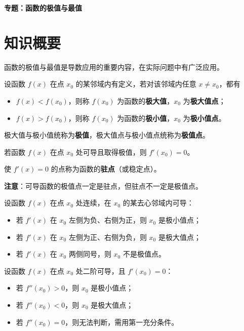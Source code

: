\documentclass[11pt]{ctexrep}
\begin{document}
\begin{center}
    {\LARGE\bfseries 专题：函数的极值与最值}
\end{center}

\section*{知识概要}

函数的极值与最值是导数应用的重要内容，在实际问题中有广泛应用。

\begin{definition}[极值]
    设函数 $f(x)$ 在点 $x_0$ 的某邻域内有定义，若对该邻域内任意 $x \neq x_0$，都有
    \begin{itemize}
        \item $f(x) < f(x_0)$，则称 $f(x_0)$ 为函数的\textbf{极大值}，$x_0$ 为\textbf{极大值点}；
        \item $f(x) > f(x_0)$，则称 $f(x_0)$ 为函数的\textbf{极小值}，$x_0$ 为\textbf{极小值点}。
    \end{itemize}
    极大值与极小值统称为\textbf{极值}，极大值点与极小值点统称为\textbf{极值点}。
\end{definition}

\begin{property}[极值的必要条件]
    若函数 $f(x)$ 在点 $x_0$ 处可导且取得极值，则 $f'(x_0) = 0$。
    
    使 $f'(x) = 0$ 的点称为函数的\textbf{驻点}（或稳定点）。
    
    \textbf{注意}：可导函数的极值点一定是驻点，但驻点不一定是极值点。
\end{property}

\begin{property}[极值的第一充分条件]
    设函数 $f(x)$ 在点 $x_0$ 处连续，在 $x_0$ 的某去心邻域内可导：
    \begin{itemize}
        \item 若 $f'(x)$ 在 $x_0$ 左侧为负、右侧为正，则 $x_0$ 是极小值点；
        \item 若 $f'(x)$ 在 $x_0$ 左侧为正、右侧为负，则 $x_0$ 是极大值点；
        \item 若 $f'(x)$ 在 $x_0$ 两侧同号，则 $x_0$ 不是极值点。
    \end{itemize}
\end{property}

\begin{property}[极值的第二充分条件]
    设函数 $f(x)$ 在点 $x_0$ 处二阶可导，且 $f'(x_0) = 0$：
    \begin{itemize}
        \item 若 $f''(x_0) > 0$，则 $x_0$ 是极小值点；
        \item 若 $f''(x_0) < 0$，则 $x_0$ 是极大值点；
        \item 若 $f''(x_0) = 0$，则无法判断，需用第一充分条件。
    \end{itemize}
\end{property}
\end{document}
